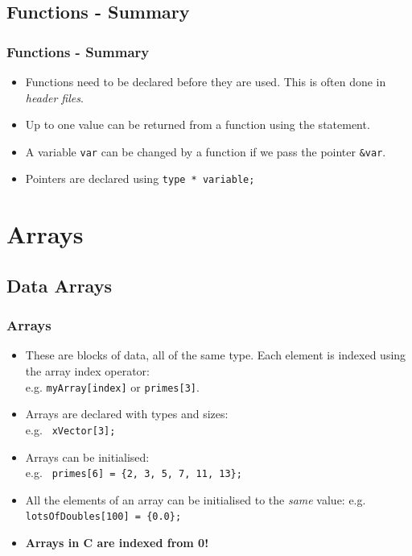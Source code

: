 \documentclass[smaller,table]{beamer}
\begin{document}
\subsection{Functions - Summary}
\begin{frame}
\frametitle{Functions - Summary}
\begin{itemize}
\item Functions need to be declared before they are used. This is often done in \emph{header files}.
\item Up to one value can be returned from a function using the  statement.
\item A variable {\tt var} can be changed by a function if we pass the pointer
{\tt \&var}.
\item Pointers are declared using {\tt type * variable;}
\end{itemize}
\end{frame}

\section{Arrays}
\subsection{Data Arrays}
\begin{frame}
\frametitle{Arrays}
\begin{itemize}
\item These are blocks of data, all of the same type. Each element is indexed
using the array index operator:\\
e.g. {\tt myArray[index]} or {\tt primes[3]}.
\item Arrays are declared with types and sizes:\\
e.g. {\tt {} xVector[3];}
\item Arrays can be initialised:\\
e.g. {\tt {} primes[6] = \{2, 3, 5, 7, 11, 13\};}
\item All the elements of an array can be initialised to the \emph{same} value:
e.g. {\tt {} lotsOfDoubles[100] = \{0.0\};}
\item \bf Arrays in C are indexed from 0!
\end{itemize}
\end{frame}
\end{document}
